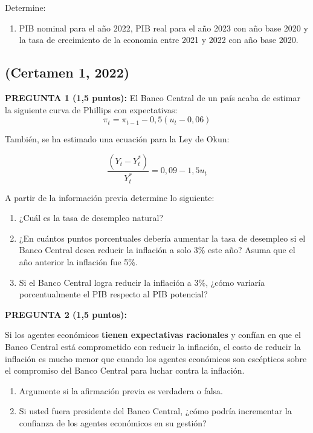 \documentclass[11pt,addpoints]{article}
\begin{document}
Determine:
\vspace*{0.1cm}
\begin{enumerate}[label=\alph*)]
    \item PIB nominal para el año 2022, PIB real para el año 2023 con año base 2020 y la tasa de crecimiento de la economia entre 2021 y 2022 con año base 2020.
\end{enumerate}


\vspace*{0.05cm}
\subsection*{(Certamen 1, 2022)}
\textbf{PREGUNTA 1 (1,5 puntos):}  
El Banco Central de un país acaba de estimar la siguiente curva de Phillips con expectativas:  
\[
\pi_t = \pi_{t-1} - 0,5(u_t - 0,06)
\]

\vspace*{0.1cm}
También, se ha estimado una ecuación para la Ley de Okun:  

\[
\frac{(Y_t - Y_t^*)}{Y_t^*} = 0,09 - 1,5u_t
\]

A partir de la información previa determine lo siguiente:  

\begin{enumerate}[label=\alph*)]
    \item ¿Cuál es la tasa de desempleo natural?  
    \item ¿En cuántos puntos porcentuales debería aumentar la tasa de desempleo si el Banco Central desea reducir la inflación a solo 3\% este año? Asuma que el año anterior la inflación fue 5\%.  
    \item Si el Banco Central logra reducir la inflación a 3\%, ¿cómo variaría porcentualmente el PIB respecto al PIB potencial?  
\end{enumerate}

\vspace{0.4cm}

\textbf{PREGUNTA 2 (1,5 puntos):}  

Si los agentes económicos \textbf{tienen expectativas racionales} y confían en que el Banco Central está comprometido con reducir la inflación, el costo de reducir la inflación es mucho menor que cuando los agentes económicos son escépticos sobre el compromiso del Banco Central para luchar contra la inflación.  

\begin{enumerate}[label=\alph*)]
    \item Argumente si la afirmación previa es verdadera o falsa.  
    \item Si usted fuera presidente del Banco Central, ¿cómo podría incrementar la confianza de los agentes económicos en su gestión?  
\end{enumerate}
\end{document}
